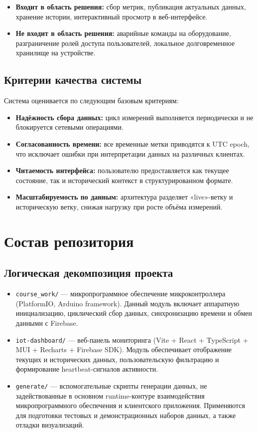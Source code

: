 \begin{itemize}
    \item \textbf{Входит в область решения:} сбор метрик, публикация актуальных данных, хранение истории, интерактивный просмотр в веб-интерфейсе.
    \item \textbf{Не входит в область решения:} аварийные команды на оборудование, разграничение ролей доступа пользователей, локальное долговременное хранилище на устройстве.
\end{itemize}

\subsection{Критерии качества системы}

Система оценивается по следующим базовым критериям:

\begin{itemize}
    \item \textbf{Надёжность сбора данных:} цикл измерений выполняется периодически и не блокируется сетевыми операциями.
    \item \textbf{Согласованность времени:} все временные метки приводятся к UTC epoch, что исключает ошибки при интерпретации данных на различных клиентах.
    \item \textbf{Читаемость интерфейса:} пользователю предоставляется как текущее состояние, так и исторический контекст в структурированном формате.
    \item \textbf{Масштабируемость по данным:} архитектура разделяет «live»-ветку и историческую ветку, снижая нагрузку при росте объёма измерений.
\end{itemize}

\section{Состав репозитория}

\subsection{Логическая декомпозиция проекта}

\begin{itemize}
    \item \texttt{course\_work/} --- микропрограммное обеспечение микроконтроллера (PlatformIO, Arduino framework). Данный модуль включает аппаратную инициализацию, циклический сбор данных, синхронизацию времени и обмен данными с Firebase.
    \item \texttt{iot-dashboard/} --- веб-панель мониторинга (Vite + React + TypeScript + MUI + Recharts + Firebase SDK). Модуль обеспечивает отображение текущих и исторических данных, пользовательскую фильтрацию и формирование heartbeat-сигналов активности.
    \item \texttt{generate/} --- вспомогательные скрипты генерации данных, не задействованные в основном runtime-контуре взаимодействия микропрограммного обеспечения и клиентского приложения. Применяются для подготовки тестовых и демонстрационных наборов данных, а также отладки визуализаций.
\end{itemize}

